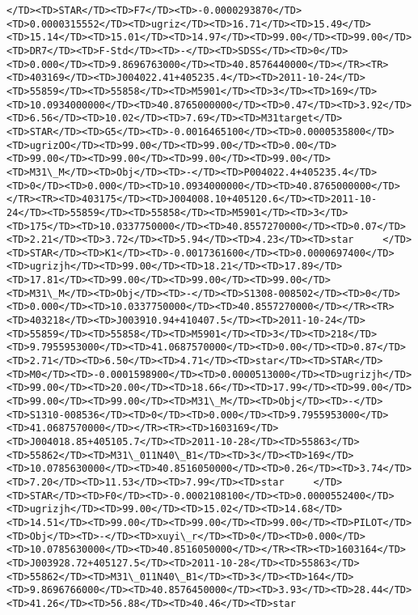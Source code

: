 \documentclass[11pt]{article}
\begin{document}
\begin{Verbatim}[commandchars=\\\{\}]
</TD><TD>STAR</TD><TD>F7</TD><TD>-0.0000293870</TD><TD>0.0000315552</TD><TD>ugriz</TD><TD>16.71</TD><TD>15.49</TD><TD>15.14</TD><TD>15.01</TD><TD>14.97</TD><TD>99.00</TD><TD>99.00</TD><TD>DR7</TD><TD>F-Std</TD><TD>-</TD><TD>SDSS</TD><TD>0</TD><TD>0.000</TD><TD>9.8696763000</TD><TD>40.8576440000</TD></TR><TR><TD>403169</TD><TD>J004022.41+405235.4</TD><TD>2011-10-24</TD><TD>55859</TD><TD>55858</TD><TD>M5901</TD><TD>3</TD><TD>169</TD><TD>10.0934000000</TD><TD>40.8765000000</TD><TD>0.47</TD><TD>3.92</TD><TD>6.56</TD><TD>10.02</TD><TD>7.69</TD><TD>M31target</TD><TD>STAR</TD><TD>G5</TD><TD>-0.0016465100</TD><TD>0.0000535800</TD><TD>ugrizOO</TD><TD>99.00</TD><TD>99.00</TD><TD>0.00</TD><TD>99.00</TD><TD>99.00</TD><TD>99.00</TD><TD>99.00</TD><TD>M31\_M</TD><TD>Obj</TD><TD>-</TD><TD>P004022.4+405235.4</TD><TD>0</TD><TD>0.000</TD><TD>10.0934000000</TD><TD>40.8765000000</TD></TR><TR><TD>403175</TD><TD>J004008.10+405120.6</TD><TD>2011-10-24</TD><TD>55859</TD><TD>55858</TD><TD>M5901</TD><TD>3</TD><TD>175</TD><TD>10.0337750000</TD><TD>40.8557270000</TD><TD>0.07</TD><TD>2.21</TD><TD>3.72</TD><TD>5.94</TD><TD>4.23</TD><TD>star     </TD><TD>STAR</TD><TD>K1</TD><TD>-0.0017361600</TD><TD>0.0000697400</TD><TD>ugrizjh</TD><TD>99.00</TD><TD>18.21</TD><TD>17.89</TD><TD>17.81</TD><TD>99.00</TD><TD>99.00</TD><TD>99.00</TD><TD>M31\_M</TD><TD>Obj</TD><TD>-</TD><TD>S1308-008502</TD><TD>0</TD><TD>0.000</TD><TD>10.0337750000</TD><TD>40.8557270000</TD></TR><TR><TD>403218</TD><TD>J003910.94+410407.5</TD><TD>2011-10-24</TD><TD>55859</TD><TD>55858</TD><TD>M5901</TD><TD>3</TD><TD>218</TD><TD>9.7955953000</TD><TD>41.0687570000</TD><TD>0.00</TD><TD>0.87</TD><TD>2.71</TD><TD>6.50</TD><TD>4.71</TD><TD>star</TD><TD>STAR</TD><TD>M0</TD><TD>-0.0001598900</TD><TD>0.0000513000</TD><TD>ugrizjh</TD><TD>99.00</TD><TD>20.00</TD><TD>18.66</TD><TD>17.99</TD><TD>99.00</TD><TD>99.00</TD><TD>99.00</TD><TD>M31\_M</TD><TD>Obj</TD><TD>-</TD><TD>S1310-008536</TD><TD>0</TD><TD>0.000</TD><TD>9.7955953000</TD><TD>41.0687570000</TD></TR><TR><TD>1603169</TD><TD>J004018.85+405105.7</TD><TD>2011-10-28</TD><TD>55863</TD><TD>55862</TD><TD>M31\_011N40\_B1</TD><TD>3</TD><TD>169</TD><TD>10.0785630000</TD><TD>40.8516050000</TD><TD>0.26</TD><TD>3.74</TD><TD>7.20</TD><TD>11.53</TD><TD>7.99</TD><TD>star     </TD><TD>STAR</TD><TD>F0</TD><TD>-0.0002108100</TD><TD>0.0000552400</TD><TD>ugrizjh</TD><TD>99.00</TD><TD>15.02</TD><TD>14.68</TD><TD>14.51</TD><TD>99.00</TD><TD>99.00</TD><TD>99.00</TD><TD>PILOT</TD><TD>Obj</TD><TD>-</TD><TD>xuyi\_r</TD><TD>0</TD><TD>0.000</TD><TD>10.0785630000</TD><TD>40.8516050000</TD></TR><TR><TD>1603164</TD><TD>J003928.72+405127.5</TD><TD>2011-10-28</TD><TD>55863</TD><TD>55862</TD><TD>M31\_011N40\_B1</TD><TD>3</TD><TD>164</TD><TD>9.8696766000</TD><TD>40.8576450000</TD><TD>3.93</TD><TD>28.44</TD><TD>41.26</TD><TD>56.88</TD><TD>40.46</TD><TD>star     
\end{Verbatim}
\end{document}
